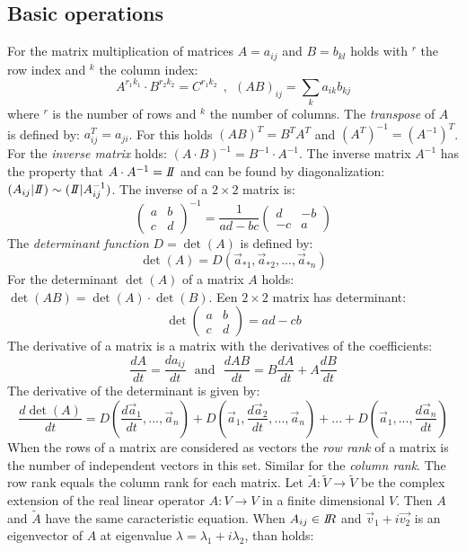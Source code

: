 \documentclass[twoside]{report}
\begin{document}
\subsection{Basic operations}
For the matrix multiplication of matrices $A=a_{ij}$ and $B=b_{kl}$ holds
with $^r$ the row index and $^k$ the column index:
\[
A^{r_1k_1}\cdot B^{r_2k_2}=C^{r_1k_2}~~,~~(AB)_{ij}=\sum_ka_{ik}b_{kj}
\]
where $^r$ is the number of rows and $^k$ the number of columns.
\npar
The {\it transpose} of $A$ is defined by: $a_{ij}^T=a_{ji}$.
For this holds $(AB)^T=B^TA^T$ and $(A^T)^{-1}=(A^{-1})^T$. For the
{\it inverse matrix} holds: $(A\cdot B)^{-1}=B^{-1}\cdot A^{-1}$. The inverse
matrix $A^{-1}$ has the property that $A\cdot A^{-1}=I\hspace{-1mm}I$ and can be found by
diagonalization: $(A_{ij}|I\hspace{-1mm}I)\sim(I\hspace{-1mm}I|A_{ij}^{-1})$.
\npar
The inverse of a $2\times2$ matrix is:
\[
\left(\begin{array}{cc}a&b\\ c&d\end{array}\right)^{-1}=\frac{1}{ad-bc}
\left(\begin{array}{cc}d&-b\\ -c&a\end{array}\right)
\]
\npar
The {\it determinant function} $D=\det(A)$ is defined by:
\[
\det(A)=D(\vec{a}_{*1},\vec{a}_{*2},...,\vec{a}_{*n})
\]
For the determinant $\det(A)$ of a matrix $A$ holds:
$\det(AB)=\det(A)\cdot\det(B)$. Een $2\times2$ matrix has determinant:
\[
\det\left(\begin{array}{cc}a&b\\ c&d \end{array}\right)=ad-cb
\]
The derivative of a matrix is a matrix with the derivatives of the coefficients:
\[
\frac{dA}{dt}=\frac{da_{ij}}{dt}~~~\mbox{and}~~~\frac{dAB}{dt}=B\frac{dA}{dt}+A\frac{dB}{dt}
\]
The derivative of the determinant is given by:
\[
\frac{d\det(A)}{dt}=D(\frac{d\vec{a}_1}{dt},...,\vec{a}_n)+
D(\vec{a}_1,\frac{d\vec{a}_2}{dt},...,\vec{a}_n)+...+D(\vec{a}_1,...,\frac{d\vec{a}_n}{dt})
\]
When the rows of a matrix are considered as vectors the {\it row rank} of a
matrix is the number of independent vectors in this set. Similar for the
{\it column rank}. The row rank equals the column rank for each matrix.
\npar
Let $\tilde{A}:\tilde{V}\rightarrow\tilde{V}$ be the complex extension of the
real linear operator $A:V\rightarrow V$ in a finite dimensional $V$.
Then $A$ and $\tilde{A}$ have the same caracteristic equation.
\npar
When $A_{ij}\in I\hspace{-1mm}R$ and $\vec{v}_1+i\vec{v_2}$ is an eigenvector of $A$
at eigenvalue $\lambda=\lambda_1+i\lambda_2$, than holds:
\end{document}
